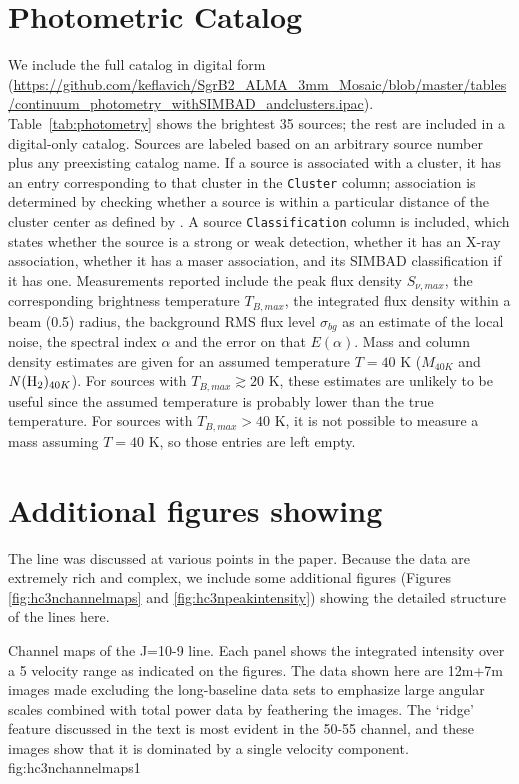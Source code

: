\documentclass[twocolumn]{aastex61}
\begin{document}
\section{Photometric Catalog}
\label{sec:catalog}
We include the full catalog in digital form
(\url{https://github.com/keflavich/SgrB2_ALMA_3mm_Mosaic/blob/master/tables/continuum_photometry_withSIMBAD_andclusters.ipac}).
Table~\ref{tab:photometry} shows
the brightest 35 sources; the rest are included in a digital-only catalog.
Sources are labeled based on an arbitrary source
number plus any preexisting catalog name.  If a source is associated with a cluster,
it has an entry corresponding to that cluster in the \texttt{Cluster} column;
association is determined by checking whether a source is within a particular distance
of the cluster center as defined by \citet{Schmiedeke2016a}.  A source
\texttt{Classification} column is included, which states whether the source
is a strong or weak detection, whether it has an X-ray association, whether it
has a maser association, and its SIMBAD classification if it has one.
Measurements reported include the peak flux density $S_{\nu,max}$, the
corresponding brightness temperature $T_{B,max}$, the integrated flux density
within a beam (0.5\arcsec) radius, the background RMS flux level $\sigma_{bg}$
as an estimate of the local noise, the spectral index $\alpha$ and the error on
that $E(\alpha)$.  Mass and column density estimates are given for an assumed
temperature $T=40$ K ($M_{40K}$ and $N(\textrm{H}_{2})_{40K}$).  For sources with
$T_{B,max}\gtrsim20$ K, these estimates are unlikely to be useful since the
assumed temperature is probably lower than the true temperature.
For sources with $T_{B,max}>40$ K, it is not possible to measure a mass
assuming $T=40$ K, so those entries are left empty.



\section{Additional figures showing \cyanoacetylene}
\label{sec:hc3nfigures}
The \cyanoacetylene line was discussed at various points in the paper.  Because
the data are extremely rich and complex,  we include some additional figures
(Figures \ref{fig:hc3nchannelmaps} and \ref{fig:hc3npeakintensity}) showing the
detailed
structure of the lines here.

{Channel maps of the \cyanoacetylene J=10-9 line.  Each panel shows the integrated
intensity over a 5 \kms velocity range as indicated on the figures.
The data shown here are 
12m+7m images made excluding the long-baseline data sets to emphasize
large angular scales
combined with total power
data by feathering the images.
The `ridge' feature  discussed in the text is most evident in the 50-55 \kms
channel, and these images show that it is dominated by a single velocity
component.
}
{fig:hc3nchannelmaps}{1}{\textwidth}
\end{document}
